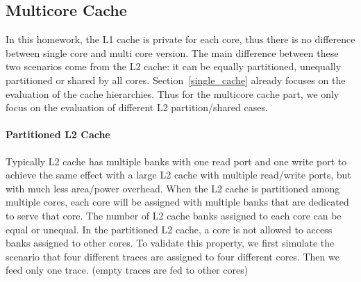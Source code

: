 \documentclass[12pt]{report}
\newcommand{\Sec}[1]{Section~\ref{#1}}
\begin{document}
\subsection{Multicore Cache}

In this homework, the L1 cache is private for each core, thus there is no difference between single core and multi core version. The main difference between these two scenarios come from the L2 cache: it can be equally partitioned, unequally partitioned or shared by all cores. \Sec{single_cache} already focuses on the evaluation of the cache hierarchies. Thus for the multicore cache part, we only focus on the evaluation of different L2 partition/shared cases.

\paragraph{Partitioned L2 Cache}
Typically L2 cache has multiple banks with one read port and one write port to achieve the same effect with a large L2 cache with multiple read/write ports, but with much less area/power overhead. When the L2 cache is partitioned among multiple cores, each core will be assigned with multiple banks that are dedicated to serve that core. The number of L2 cache banks assigned to each core can be equal or unequal. In the partitioned L2 cache, a core is not allowed to access banks assigned to other cores. To validate this property, we first simulate the scenario that four different traces are assigned to four different cores. Then we feed only one trace. (empty traces are fed to other cores)
\end{document}
